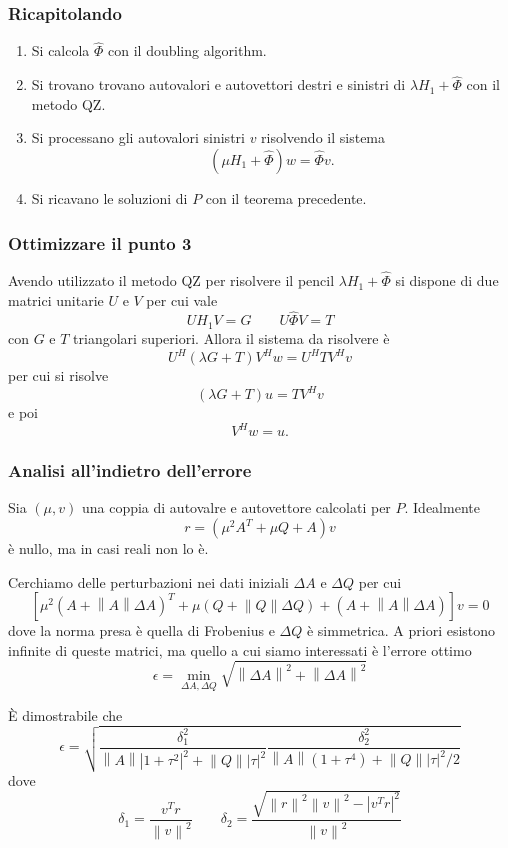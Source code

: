 \documentclass{beamer}
\newcommand{\norm}[1]{\left\lVert#1\right\rVert}
\begin{document}
\begin{frame} 
\frametitle{Ricapitolando}
    \begin{enumerate}
        \item Si calcola $\hat{\Phi}$ con il doubling algorithm.
        \item Si trovano trovano autovalori e autovettori destri e sinistri di
            $\lambda H_1+\hat{\Phi}$ con il metodo QZ.
        \item Si processano gli autovalori sinistri $v$ risolvendo il sistema
            \[
                (\mu H_1 + \hat{\Phi}) w = \hat{\Phi} v.
            \]
        \item Si ricavano le soluzioni di $P$ con il teorema precedente.
    \end{enumerate}
\end{frame} 


\begin{frame}
\frametitle{Ottimizzare il punto 3}
    Avendo utilizzato il metodo QZ per risolvere il pencil $\lambda H_1
    +\hat{\Phi}$ si dispone di due matrici unitarie $U$ e $V$ per cui vale
    \[
        UH_1V = G \qquad
        U\hat{\Phi}V = T
    \]
    con $G$ e $T$ triangolari superiori. Allora il sistema da risolvere \`e
    \[
        U^H (\lambda G+T)V^Hw = U^HTV^Hv
    \]
    per cui si risolve
    \[
        (\lambda G+T)u = TV^Hv
    \]
    e poi
    \[
        V^Hw = u.
    \]
\end{frame}


\begin{frame}
\frametitle{Analisi all'indietro dell'errore}
    Sia $(\mu,v)$ una coppia di autovalre e autovettore calcolati per $P$.
    Idealmente 
    \[
        r = (\mu^2A^T+\mu Q+A)v
    \]
    \`e nullo, ma in casi reali non lo \`e.

    Cerchiamo delle perturbazioni nei dati iniziali $\Delta A$ e $\Delta Q$ per
    cui
    \[
        [\mu^2 (A+\norm{A}\Delta A)^T + \mu (Q+\norm{Q}\Delta Q) +
        (A+\norm{A}\Delta A)] v = 0
    \]
    dove la norma presa \`e quella di Frobenius e $\Delta Q$ \`e simmetrica.
    A priori esistono infinite di queste matrici, ma quello a cui siamo
    interessati \`e l'errore ottimo
    \[
        \epsilon = \min_{\Delta A, \Delta Q} \sqrt{\norm{\Delta A}^2 + 
        \norm{\Delta A}^2}
    \]
\end{frame}

\begin{frame}
    \`E dimostrabile che 
    \[
        \epsilon = \sqrt{
        \frac{\delta_1^2}{\norm{A}|1+\tau^2|^2 + \norm{Q} |\tau|^2}
        \frac{\delta_2^2}{\norm{A}(1+\tau^4) + \norm{Q} |\tau|^2/2}
        }
    \]
    dove
    \[
        \delta_1 = \frac{v^T r}{\norm{v}^2} \qquad
        \delta_2 = \frac{\sqrt{\norm{r}^2\norm{v}^2-|v^Tr|^2}}
        {{\norm{v}^2}}
    \]
\end{frame}
\end{document}
